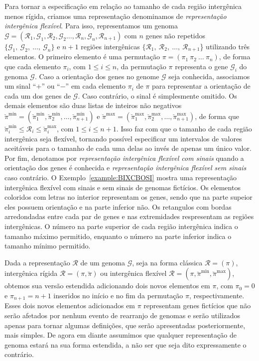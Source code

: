 Para tornar a especificação em relação ao tamanho de cada região intergênica menos rígida, criamos uma representação denominamos de \emph{representação intergênica flexível}. Para isso, representamos um genoma $\mathcal{G}=(\mathcal{R}_1,\mathcal{G}_1,\mathcal{R}_2,\mathcal{G}_2\dots,\mathcal{R}_n,\mathcal{G}_n,\mathcal{R}_{n+1})$ com $n$ genes não repetidos $\{\mathcal{G}_1,\:\mathcal{G}_2,\:\dots,\:\mathcal{G}_n\}$ e $n+1$ regiões intergênicas $\{\mathcal{R}_1,\:\mathcal{R}_2,\:\dots,\:\mathcal{R}_{n+1}$\} utilizando três elementos. O primeiro elemento é uma permutação $\pi=(\pi_1~\pi_2~\dots~\pi_n)$, de forma que cada elemento $\pi_i$, com $1 \le i \le n$, da permutação $\pi$ representa o gene $\mathcal{G}_i$ do genoma $\mathcal{G}$. Caso a orientação dos genes no genome $\mathcal{G}$ seja conhecida, associamos um sinal ``$+$'' ou ``$-$'' em cada elemento $\pi_i$ de $\pi$ para representar a orientação de cada um dos genes de $\mathcal{G}$. Caso contrário, o sinal é simplesmente omitido. Os demais elementos são duas listas de inteiros não negativos $\breve\pi^{\min}=(\breve\pi^{\min}_1,\breve\pi^{\min}_2,\dots,\breve\pi^{\min}_{n+1})$ e $\breve\pi^{\max}=(\breve\pi^{\max}_1,\breve\pi^{\max}_2,\dots,\breve\pi^{\max}_{n+1})$, de forma que $\breve\pi^{\min}_i \le \mathcal{R}_i \le \breve\pi^{\max}_i$, com $1 \le i \le {n+1}$. Isso faz com que o tamanho de cada região intergênica seja flexível, tornando possível especificar um intervalos de valores aceitáveis para o tamanho de cada uma delas ao invés de apenas um único valor. Por fim, denotamos por \emph{representação intergênica flexível com sinais} quando a orientação dos genes é conhecida e \emph{representação intergênica flexível sem sinais} caso contrário. O Exemplo~\ref{example:BIXCBOSI} mostra uma representação intergênica flexível com sinais e sem sinais de genomas fictícios. Os elementos coloridos com letras no interior representam os genes, sendo que na parte supeior eles possuem orientação e na parte inferior não. Os retangulos com bordas arredondadas entre cada par de genes e nas extremidades respresentam as regiões intergênicas. O número na parte superior de cada região intergênica indica o tamanho máximo permitido, enquanto o número na parte inferior indica o tamanho mínimo permitido.



Dada a representação $\mathcal{R}$ de um genoma $\mathcal{G}$, seja na forma clássica $\mathcal{R}=(\pi)$, intergênica rígida $\mathcal{R}=(\pi,\breve\pi)$ ou intergênica flexível $\mathcal{R}=(\pi,\breve\pi^{\min},\breve\pi^{\max})$, obtemos sua versão estendida adicionando dois novos elementos em $\pi$, com $\pi_0 = 0$ e $\pi_{n+1} = {n+1}$ inseridos no início e no fim da permutação $\pi$, respectivamente. Esses dois novos elementos adicionados em $\pi$ representam genes fictícios que não serão afetados por nenhum evento de rearranjo de genomas e serão utilizados apenas para tornar algumas definições, que serão apresentadas posteriormente, mais simples. De agora em diante assumimos que qualquer representação de genoma estará na sua forma estendida, a não ser que seja dito expressamente o contrário.

